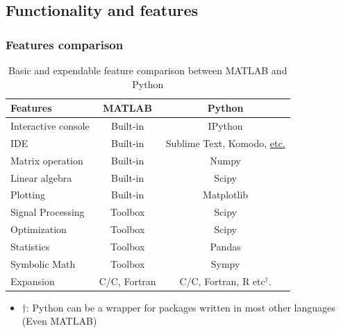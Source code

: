 \documentclass[compress]{beamer}
\newcommand{\CC}{C\nolinebreak\hspace{-.05em}\raisebox{.4ex}{\tiny\bf +}\nolinebreak\hspace{-.10em}\raisebox{.4ex}{\tiny\bf +}}
\begin{document}
\subsection{Functionality and features}
\begin{frame}
	\frametitle{Features comparison}
	\begin{table}
		\caption{Basic and expendable feature comparison between MATLAB and Python}
		\begin{tabular}{|l|c|c|}
			\hline
			Features			& 	MATLAB 		& 	Python\\\hline		
			Interactive console	&	Built-in 	& 	IPython\\\hline
			IDE					&	Built-in	&	Sublime Text, Komodo, \href{https://wiki.python.org/moin/IntegratedDevelopmentEnvironments}{etc.}\\\hline	
			Matrix operation	&	Built-in	& 	Numpy\\\hline
			Linear algebra		&	Built-in	&	Scipy\\\hline
			Plotting			& 	Built-in	&	Matplotlib\\\hline
			Signal Processing	&	Toolbox		&	Scipy\\\hline
			Optimization		&	Toolbox		&	Scipy\\\hline
			Statistics			&	Toolbox		&	Pandas\\\hline
			Symbolic Math 		&	Toolbox		&	Sympy\\\hline
			Expansion			&	C/\CC, Fortran	&	C/\CC, Fortran, R etc$^\dagger$.\\\hline
		\end{tabular}
	\end{table}
	\begin{itemize}
		\tiny \item $\dagger$: Python can be a wrapper for packages written in most other languages (Even MATLAB)
	\end{itemize}
\end{frame}
\end{document}
